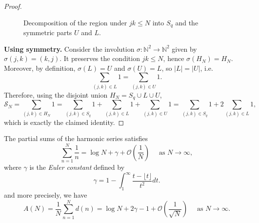 \documentclass{elegantbook}
\begin{document}
\begin{proof}
\begin{figure}[ht]
  \caption{Decomposition of the region under $jk\le N$ into $S_q$ and the symmetric parts $U$ and $L$.}
  \label{fig:HN_decomp_smooth}
  \end{figure}


  \medskip
  \noindent\textbf{Using symmetry.}
  Consider the involution \(\sigma:\mathbb N^2\to\mathbb N^2\) given by \(\sigma(j,k)=(k,j)\).
  It preserves the condition \(jk\le N\), hence \(\sigma(H_N)=H_N\).
  Moreover, by definition, \(\sigma(L)=U\) and \(\sigma(U)=L\), so \(|L|=|U|\), i.e.
  \[
    \sum_{(j,k)\in L}1=\sum_{(j,k)\in U}1.
  \]
  Therefore, using the disjoint union \(H_N=S_q\cup L\cup U\),
  \[
    \mathcal{S}_N=\sum_{(j,k)\in H_N}1
    =\sum_{(j,k)\in S_q}1+\sum_{(j,k)\in L}1+\sum_{(j,k)\in U}1
    =\sum_{(j,k)\in S_q}1+2\sum_{(j,k)\in L}1,
  \]
  which is exactly the claimed identity.
\end{proof}

\begin{theorem} \label{thm:asymptotic_formula_for_average_value_of_divisor_function}
  The partial sums of the harmonic series satisfies
  \[
    \sum_{n=1}^{N} \frac{1}{n} = \log N + \gamma + \mathcal{O}\left( \frac{1}{N} \right) \quad \text{ as } N \to \infty,
  \]
  where $\gamma$ is the \textit{Euler constant} defined by
  \[
    \gamma = 1 - \int_1^{\infty} \frac{t-\lfloor t \rfloor}{t^2} dt.
  \]
  and more precisely, we have
  \[
    A(N) = \frac{1}{N} \sum_{n=1}^{N} d(n) = \log N + 2\gamma - 1 + \mathcal{O}\left( \frac{1}{\sqrt{N}} \right) \quad \text{ as } N \to \infty.
  \]
\end{theorem}
\end{document}

